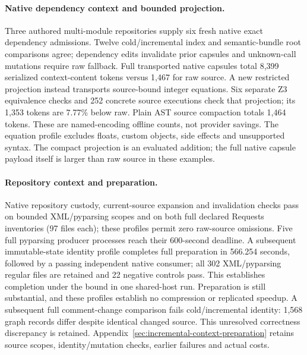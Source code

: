 \paragraph{Native dependency context and bounded projection.}
Three authored multi-module repositories supply six fresh native exact
dependency admissions. Twelve cold/incremental index and semantic-bundle root
comparisons agree; dependency edits invalidate prior capsules and unknown-call
mutations require raw fallback. Full transported native capsules total
8,399 serialized context-content
tokens versus 1,467 for raw source. A new restricted projection instead
transports source-bound integer equations. Six separate Z3 equivalence checks
and 252 concrete source executions check that projection; its 1,353
tokens are 7.77\% below raw. Plain AST source compaction totals
1,464 tokens. These are named-encoding offline counts, not provider savings.
The equation profile excludes floats, custom objects, side effects and unsupported
syntax. The compact projection is an evaluated addition; the full native capsule
payload itself is larger than raw source in these examples.

\paragraph{Repository context and preparation.}
Native repository custody, current-source expansion and invalidation checks
pass on bounded XML/pyparsing scopes and on both full declared Requests
inventories (97 files each); these profiles permit zero raw-source omissions.
Five full pyparsing producer processes reach their 600-second deadline. A
subsequent immutable-state identity profile completes full preparation in
566.254 seconds, followed by a passing independent native consumer; all
302 XML/pyparsing regular files are retained and 22 negative controls pass.
This establishes completion under the bound in one shared-host run. Preparation
is still substantial, and these profiles establish no compression or replicated
speedup. A subsequent full comment-change comparison fails cold/incremental
identity: 1,568 graph records differ despite identical changed source. This
unresolved correctness discrepancy is retained. Appendix~\ref{sec:incremental-context-preparation} retains source
scopes, identity/mutation checks, earlier failures and actual costs.

